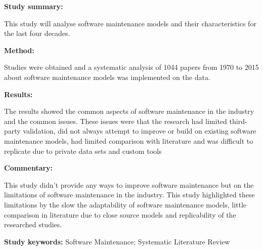 \begin{tcolorbox}[colback=gray!5!white, colframe=pastelgreen!40!black, title=Analyzing Forty Years of Software Maintenance Models\cite{Lenarduzzi2017}]
	\begin{minipage}[t]{0.25\textwidth}
		\textbf{Study summary:}
	\end{minipage}
	\hfill
	\begin{minipage}[t]{0.65\textwidth}
		This study will analyse software maintenance models and their characteristics for the last
		four decades.
	\end{minipage}

	\vspace{0.75em} 

	\begin{minipage}[t]{0.25\textwidth}
		\textbf{Method:}
	\end{minipage}
	\hfill
	\begin{minipage}[t]{0.65\textwidth}
		Studies were obtained and a systematic analysis of 1044 papers from 1970 to 2015 about software maintenance models was implemented on the data.
	\end{minipage}

	\vspace{0.75em} 

	\begin{minipage}[t]{0.25\textwidth}
		\textbf{Results:}
	\end{minipage}
	\hfill
	\begin{minipage}[t]{0.65\textwidth}
		The results showed the common aspects of software maintenance in the industry and the common issues. These issues were that the research had limited third-party validation, did not always attempt to improve or build on existing software maintenance models, had limited comparison with literature and was difficult to replicate due to private data sets and custom tools
	\end{minipage}

	\vspace{0.75em} 

	\begin{minipage}[t]{0.25\textwidth}
		\textbf{Commentary:}
	\end{minipage}
	\hfill
	\begin{minipage}[t]{0.65\textwidth}
		This study didn't provide any ways to improve software maintenance but on the limitations of
		software maintenance in the industry. This study highlighted these limitations by the slow
		the adaptability of software maintenance models, little comparison in literature due to close
		source models and replicability of the researched studies.
	\end{minipage}
	\tcblower
	\textbf{Study keywords:} Software Maintenance; Systematic Literature Review
\end{tcolorbox}

